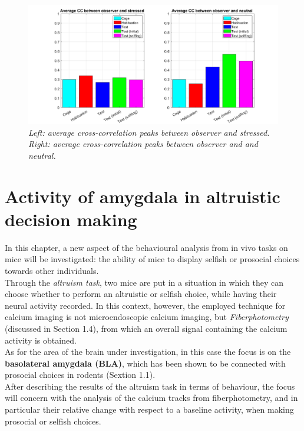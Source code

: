 \documentclass[a4paper]{article}
\begin{document}
\begin{figure}[H]
	
	\begin{center}
		\hspace*{-1.4cm}
		\includegraphics[scale=.4]{cc_average.png} 
	\end{center} 
	\caption{\textit{Left: average cross-correlation peaks between observer and stressed. Right: average cross-correlation peaks between observer and and neutral.}}
	
\end{figure}




\newpage
\section{Activity of amygdala in altruistic decision making}

In this chapter, a new aspect of the behavioural analysis from in vivo tasks on mice will be investigated: the ability of mice to display selfish or prosocial choices towards other individuals.\\
Through the \textit{altruism task}, two mice are put in a situation in which they can choose whether to perform an altruistic or selfish choice, while having their neural activity recorded. In this context, however, the employed technique for calcium imaging is not microendoscopic calcium imaging, but \textit{Fiberphotometry} (discussed in Section 1.4), from which an overall signal containing the calcium activity is obtained.\\
As for the area of the brain under investigation, in this case the focus is on the \textbf{basolateral amygdala (BLA)}, which has been shown to be connected with prosocial choices in rodents (Sextion 1.1).\\
After describing the results of the altruism task in terms of behaviour, the focus will concern with the analysis of the calcium tracks from fiberphotometry, and in particular their relative change with respect to a baseline activity, when making prosocial or selfish choices.
\end{document}
